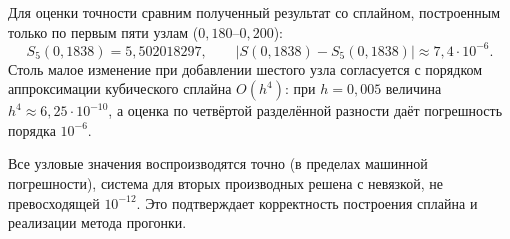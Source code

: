 \documentclass[14pt,a4paper]{extarticle}
\begin{document}
Для оценки точности сравним полученный результат со сплайном,
построенным только по первым пяти узлам ($0{,}180$--$0{,}200$):
\[
    S_5(0{,}1838)=5{,}502018297, \qquad
    |S(0{,}1838)-S_5(0{,}1838)|\approx 7{,}4\cdot10^{-6}.
\]
Столь малое изменение при добавлении шестого узла согласуется с
порядком аппроксимации кубического сплайна $O(h^4)$: при
$h=0{,}005$ величина $h^4\approx6{,}25\cdot10^{-10}$, а оценка по
четвёртой разделённой разности даёт погрешность порядка
$10^{-6}$.

Все узловые значения воспроизводятся точно (в пределах машинной
погрешности), система для вторых производных решена с невязкой, не
превосходящей $10^{-12}$. Это подтверждает корректность построения
сплайна и реализации метода прогонки.
\end{document}
